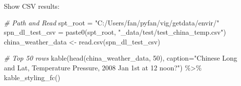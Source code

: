 \documentclass[
]{book}
\newenvironment{Shaded}{\begin{snugshade}}{\end{snugshade}}
\newcommand{\AttributeTok}[1]{\textcolor[rgb]{0.77,0.63,0.00}{#1}}
\newcommand{\CommentTok}[1]{\textcolor[rgb]{0.56,0.35,0.01}{\textit{#1}}}
\newcommand{\DecValTok}[1]{\textcolor[rgb]{0.00,0.00,0.81}{#1}}
\newcommand{\FunctionTok}[1]{\textcolor[rgb]{0.00,0.00,0.00}{#1}}
\newcommand{\NormalTok}[1]{#1}
\newcommand{\OtherTok}[1]{\textcolor[rgb]{0.56,0.35,0.01}{#1}}
\newcommand{\SpecialCharTok}[1]{\textcolor[rgb]{0.00,0.00,0.00}{#1}}
\newcommand{\StringTok}[1]{\textcolor[rgb]{0.31,0.60,0.02}{#1}}
\begin{document}
Show CSV results:

\begin{Shaded}
\begin{Highlighting}[]
\CommentTok{\# Path and Read}
\NormalTok{spt\_root }\OtherTok{=} \StringTok{"C:/Users/fan/pyfan/vig/getdata/envir/"}
\NormalTok{spn\_dl\_test\_csv }\OtherTok{=} \FunctionTok{paste0}\NormalTok{(spt\_root, }\StringTok{"\_data/test/test\_china\_temp.csv"}\NormalTok{)}
\NormalTok{china\_weather\_data }\OtherTok{\textless{}{-}} \FunctionTok{read.csv}\NormalTok{(spn\_dl\_test\_csv)}

\CommentTok{\# Top 50 rows}
\FunctionTok{kable}\NormalTok{(}\FunctionTok{head}\NormalTok{(china\_weather\_data, }\DecValTok{50}\NormalTok{),}
      \AttributeTok{caption=}\StringTok{"Chinese Long and Lat, Temperature Pressure, 2008 Jan 1st at 12 noon?"}\NormalTok{) }\SpecialCharTok{\%\textgreater{}\%}
  \FunctionTok{kable\_styling\_fc}\NormalTok{()}
\end{Highlighting}
\end{Shaded}
\end{document}
